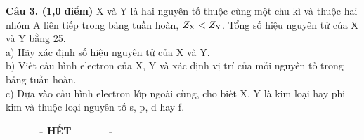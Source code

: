 \documentclass[11pt,a4paper]{article}
\begin{document}
\vspace{1pt}
\noindent
{}

\vspace{4pt}
\noindent
\textbf{Câu 3. (1,0 điểm)} X và Y là hai nguyên tố thuộc cùng một chu kì và thuộc hai nhóm A liên tiếp trong bảng tuần hoàn, $Z_{\ce{X}} < Z_{\ce{Y}}$. Tổng số hiệu nguyên tử của X và Y bằng 25.\\
a) Hãy xác định số hiệu nguyên tử của X và Y.\\
b) Viết cấu hình electron của X, Y và xác định vị trí của mỗi nguyên tố trong bảng tuần hoàn.\\
c) Dựa vào cấu hình electron lớp ngoài cùng, cho biết X, Y là kim loại hay phi kim và thuộc loại nguyên tố s, p, d hay f.

\vspace{1pt}
\noindent
{}

\vspace{6pt}
\begin{center}
\textbf{\large ---------- HẾT ----------}
\end{center}
\end{document}
